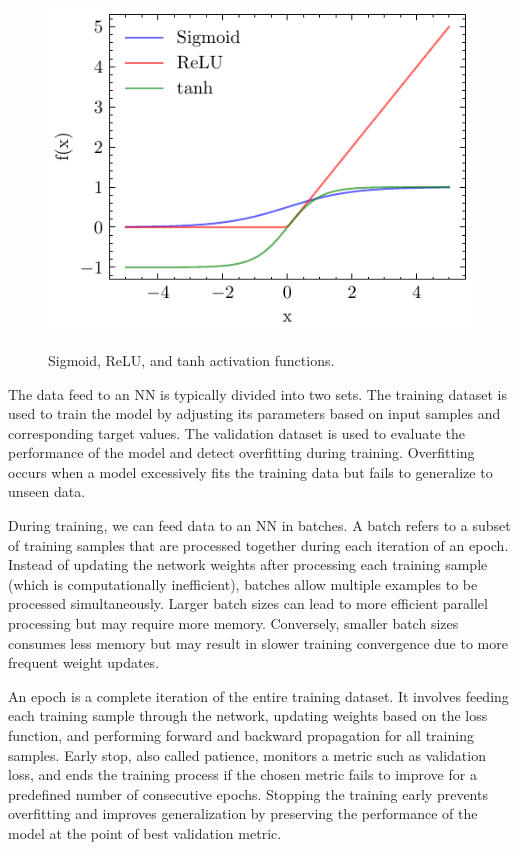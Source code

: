 \documentclass[ppgc,diss,english]{iiufrgs}
\begin{document}
\begin{figure}[tb]
\caption[Common activation functions]{Sigmoid, ReLU, and tanh activation functions.}
\vspace{\baselineskip}
\centering
\includegraphics[scale=1.0]{img/sigmoid-relu-tanh}
\label{fig:activation-functions}
\end{figure}

The data feed to an NN is typically divided into two sets. The training dataset is used to train the model by adjusting its parameters based on input samples and corresponding target values. The validation dataset is used to evaluate the performance of the model and detect overfitting during training. Overfitting occurs when a model excessively fits the training data but fails to generalize to unseen data.

During training, we can feed data to an NN in batches. A batch refers to a subset of training samples that are processed together during each iteration of an epoch. Instead of updating the network weights after processing each training sample (which is computationally inefficient), batches allow multiple examples to be processed simultaneously. Larger batch sizes can lead to more efficient parallel processing but may require more memory. Conversely, smaller batch sizes consumes less memory but may result in slower training convergence due to more frequent weight updates.

An epoch is a complete iteration of the entire training dataset. It involves feeding each training sample through the network, updating weights based on the loss function, and performing forward and backward propagation for all training samples. Early stop, also called patience, monitors a metric such as validation loss, and ends the training process if the chosen metric fails to improve for a predefined number of consecutive epochs. Stopping the training early prevents overfitting and improves generalization by preserving the performance of the model at the point of best validation metric.
\end{document}
